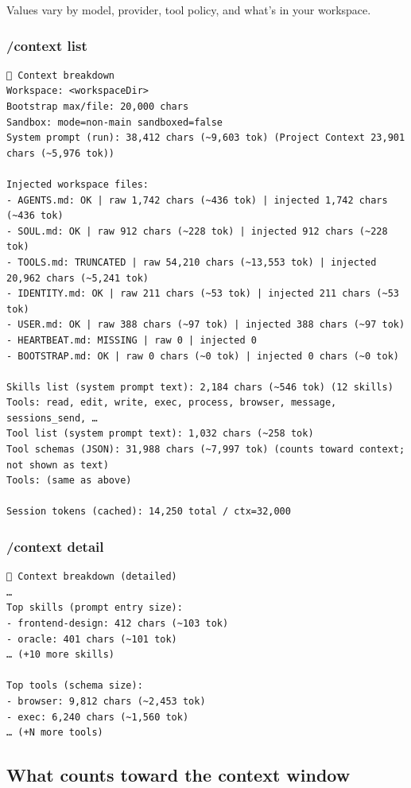 Values vary by model, provider, tool policy, and what’s in your workspace.

\subsubsection{/context list}


\begin{lstlisting}
🧠 Context breakdown
Workspace: <workspaceDir>
Bootstrap max/file: 20,000 chars
Sandbox: mode=non-main sandboxed=false
System prompt (run): 38,412 chars (~9,603 tok) (Project Context 23,901 chars (~5,976 tok))

Injected workspace files:
- AGENTS.md: OK | raw 1,742 chars (~436 tok) | injected 1,742 chars (~436 tok)
- SOUL.md: OK | raw 912 chars (~228 tok) | injected 912 chars (~228 tok)
- TOOLS.md: TRUNCATED | raw 54,210 chars (~13,553 tok) | injected 20,962 chars (~5,241 tok)
- IDENTITY.md: OK | raw 211 chars (~53 tok) | injected 211 chars (~53 tok)
- USER.md: OK | raw 388 chars (~97 tok) | injected 388 chars (~97 tok)
- HEARTBEAT.md: MISSING | raw 0 | injected 0
- BOOTSTRAP.md: OK | raw 0 chars (~0 tok) | injected 0 chars (~0 tok)

Skills list (system prompt text): 2,184 chars (~546 tok) (12 skills)
Tools: read, edit, write, exec, process, browser, message, sessions_send, …
Tool list (system prompt text): 1,032 chars (~258 tok)
Tool schemas (JSON): 31,988 chars (~7,997 tok) (counts toward context; not shown as text)
Tools: (same as above)

Session tokens (cached): 14,250 total / ctx=32,000
\end{lstlisting}


\subsubsection{/context detail}


\begin{lstlisting}
🧠 Context breakdown (detailed)
…
Top skills (prompt entry size):
- frontend-design: 412 chars (~103 tok)
- oracle: 401 chars (~101 tok)
… (+10 more skills)

Top tools (schema size):
- browser: 9,812 chars (~2,453 tok)
- exec: 6,240 chars (~1,560 tok)
… (+N more tools)
\end{lstlisting}


\subsection{What counts toward the context window}


